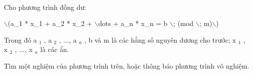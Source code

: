  

Cho phương trình đồng dư:

$\backslash$(a\_1 * x\_1 + a\_2 * x\_2 + $\backslash$dots + a\_n * x\_n = b $\backslash$; (mod $\backslash$; m)$\backslash$)

Trong đó a $_ 1 $ , a $_ 2 $ , ..., a $_ n $ , b và m là các hằng số nguyên dương cho trước; x $_ 1 $ , x $_ 2 $ , ..., x $_ n $ là các ẩn.

Tìm một nghiệm của phương trình trên, hoặc thông báo phương trình vô nghiệm.

\